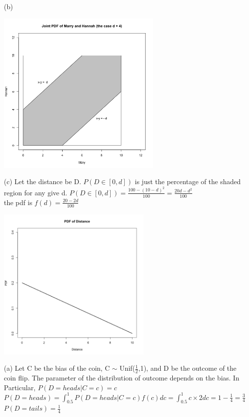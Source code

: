 \documentclass[11pt]{article}
\newenvironment{problem}[2][Problem]{\begin{trivlist}
\item[\hskip \labelsep {\bfseries #1}\hskip \labelsep {\bfseries #2.}]}{\end{trivlist}}
\begin{document}
\newpage

(b)\begin{center}
\includegraphics[height = 3.2in]{Q4_2}
\end{center}
 
 
 (c)  Let the distance be D. $P(D \in [0,d]) $ is just the percentage of the shaded region for any give d.
 $P(D \in [0,d])  = \frac{100 - (10-d)^2}{100} = \frac{20d - d^2}{100}$\\
 the pdf is $ f (d)= \frac{20 - 2d}{100}$
 \begin{center}
 	\includegraphics[height = 3in]{Q4_3}
 \end{center}
 
 \begin{problem}{5}
 \end{problem}
  (a) Let C be the bias of the coin, C $\sim $ Unif($\frac{1}{2}$,1), and D be the outcome of the coin flip. The parameter of the distribution of outcome depends on the bias. In Particular,   $P(D = heads|C = c ) = c $\\
  $P(D = heads) = \int_{0.5}^{1} P(D = heads| C = c ) f(c)dc = \int^{1}_{0.5} c \times 2 dc = 1- \frac{1}{4} = \frac{3}{4}$\\
  $P(D = tails ) = \frac{1}{4}$\\
  
\end{document}
